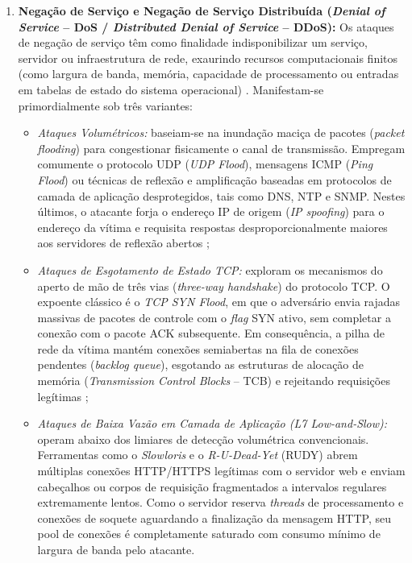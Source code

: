 \begin{enumerate}
    \item \textbf{Negação de Serviço e Negação de Serviço Distribuída (\emph{Denial of Service} -- DoS / \emph{Distributed Denial of Service} -- DDoS):}
    Os ataques de negação de serviço têm como finalidade indisponibilizar um serviço, servidor ou infraestrutura de rede, exaurindo recursos computacionais finitos (como largura de banda, memória, capacidade de processamento ou entradas em tabelas de estado do sistema operacional) \cite{Sharafaldin2018TowardGA}. Manifestam-se primordialmente sob três variantes:
    \begin{itemize}
        \item \emph{Ataques Volumétricos:} baseiam-se na inundação maciça de pacotes (\emph{packet flooding}) para congestionar fisicamente o canal de transmissão. Empregam comumente o protocolo UDP (\emph{UDP Flood}), mensagens ICMP (\emph{Ping Flood}) ou técnicas de reflexão e amplificação baseadas em protocolos de camada de aplicação desprotegidos, tais como DNS, NTP e SNMP. Nestes últimos, o atacante forja o endereço IP de origem (\emph{IP spoofing}) para o endereço da vítima e requisita respostas desproporcionalmente maiores aos servidores de reflexão abertos \cite{ciciot2023};
        \item \emph{Ataques de Esgotamento de Estado TCP:} exploram os mecanismos do aperto de mão de três vias (\emph{three-way handshake}) do protocolo TCP. O expoente clássico é o \emph{TCP SYN Flood}, em que o adversário envia rajadas massivas de pacotes de controle com o \emph{flag} SYN ativo, sem completar a conexão com o pacote ACK subsequente. Em consequência, a pilha de rede da vítima mantém conexões semiabertas na fila de conexões pendentes (\emph{backlog queue}), esgotando as estruturas de alocação de memória (\emph{Transmission Control Blocks} -- TCB) e rejeitando requisições legítimas \cite{Sharafaldin2018TowardGA};
        \item \emph{Ataques de Baixa Vazão em Camada de Aplicação (L7 Low-and-Slow):} operam abaixo dos limiares de detecção volumétrica convencionais. Ferramentas como o \emph{Slowloris} e o \emph{R-U-Dead-Yet} (RUDY) abrem múltiplas conexões HTTP/HTTPS legítimas com o servidor web e enviam cabeçalhos ou corpos de requisição fragmentados a intervalos regulares extremamente lentos. Como o servidor reserva \emph{threads} de processamento e conexões de soquete aguardando a finalização da mensagem HTTP, seu pool de conexões é completamente saturado com consumo mínimo de largura de banda pelo atacante.
    \end{itemize}


\end{enumerate}
